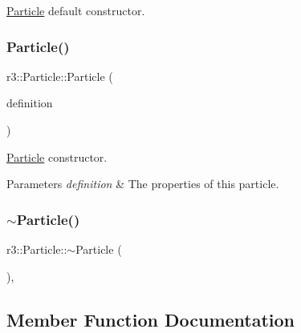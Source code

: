 \mbox{\hyperlink{classr3_1_1_particle}{Particle}} default constructor. 

\mbox{\label{classr3_1_1_particle_a28a47b80f79433db842a47aca835003a}} 
\subsubsection{\texorpdfstring{Particle()}{Particle()}\hspace{0.1cm}{\footnotesize\ttfamily [2/2]}}
{\footnotesize\ttfamily r3\+::\+Particle\+::\+Particle (\begin{DoxyParamCaption}\item[{const \mbox{\hyperlink{structr3_1_1_particle_def}{Particle\+Def}} \&}]{definition }\end{DoxyParamCaption})\hspace{0.3cm}{\ttfamily [explicit]}}



\mbox{\hyperlink{classr3_1_1_particle}{Particle}} constructor. 


\begin{DoxyParams}{Parameters}
{\em definition} & The properties of this particle. \\
\hline
\end{DoxyParams}
\mbox{\label{classr3_1_1_particle_a235fd8a567a6ec911f26ca49a8045460}} 
\subsubsection{\texorpdfstring{$\sim$\+Particle()}{~Particle()}}
{\footnotesize\ttfamily r3\+::\+Particle\+::$\sim$\+Particle (\begin{DoxyParamCaption}{ }\end{DoxyParamCaption})\hspace{0.3cm}{\ttfamily [virtual]}, {\ttfamily [default]}}



\subsection{Member Function Documentation}
\mbox{\label{classr3_1_1_particle_a18bc9d9ded382879086eb2820ce787c9}} 
